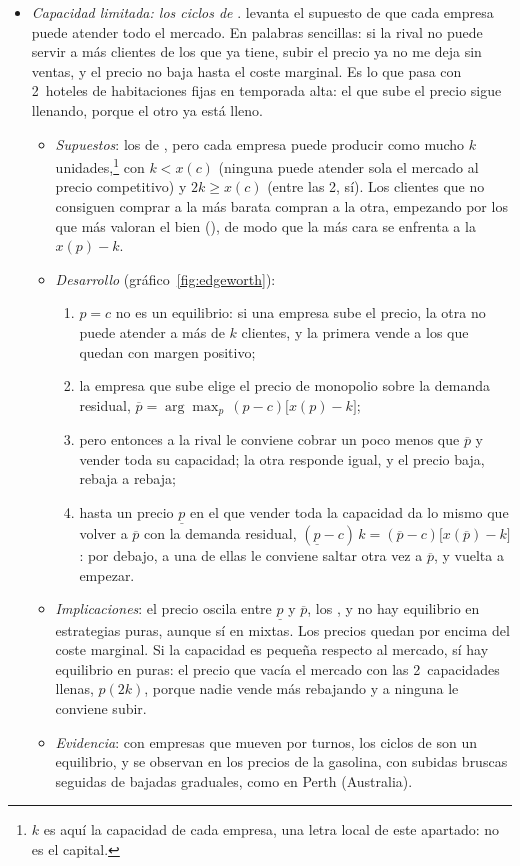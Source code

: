 \documentclass[11pt]{article}
\begin{document}
\begin{itemize}
\item \emph{Capacidad limitada: los ciclos de }. \textcite{Edgeworth1897Teoria} levanta el supuesto de que cada empresa puede atender todo el mercado. En palabras sencillas: si la rival no puede servir a más clientes de los que ya tiene, subir el precio ya no me deja sin ventas, y el precio no baja hasta el coste marginal. Es lo que pasa con 2~hoteles de habitaciones fijas en temporada alta: el que sube el precio sigue llenando, porque el otro ya está lleno.
  \begin{itemize}
  \item \emph{Supuestos}: los de , pero cada empresa puede producir como mucho $k$ unidades,\footnote{$k$ es aquí la capacidad de cada empresa, una letra local de este apartado: no es el capital.} con $k<x(c)$ (ninguna puede atender sola el mercado al precio competitivo) y $2k\geq x(c)$ (entre las 2, sí). Los clientes que no consiguen comprar a la más barata compran a la otra, empezando por los que más valoran el bien (), de modo que la más cara se enfrenta a la  $x(p)-k$.
  \item \emph{Desarrollo} (gráfico~\ref{fig:edgeworth}):
    \begin{enumerate}
    \item $p=c$ no es un equilibrio: si una empresa sube el precio, la otra no puede atender a más de $k$ clientes, y la primera vende a los que quedan con margen positivo;
    \item la empresa que sube elige el precio de monopolio sobre la demanda residual, $\overline{p}=\arg\max_p\,(p-c)\big[x(p)-k\big]$;
    \item pero entonces a la rival le conviene cobrar un poco menos que $\overline{p}$ y vender toda su capacidad; la otra responde igual, y el precio baja, rebaja a rebaja;
    \item hasta un precio $\underline{p}$ en el que vender toda la capacidad da lo mismo que volver a $\overline{p}$ con la demanda residual, $(\underline{p}-c)\,k=(\overline{p}-c)\big[x(\overline{p})-k\big]$: por debajo, a una de ellas le conviene saltar otra vez a $\overline{p}$, y vuelta a empezar.
    \end{enumerate}
  \item \emph{Implicaciones}: el precio oscila entre $\underline{p}$ y $\overline{p}$, los , y no hay equilibrio en estrategias puras, aunque sí en mixtas\nocite{LevitanShubik1972Price}. Los precios quedan por encima del coste marginal. Si la capacidad es pequeña respecto al mercado, sí hay equilibrio en puras: el precio que vacía el mercado con las 2~capacidades llenas, $p(2k)$, porque nadie vende más rebajando y a ninguna le conviene subir.
  \item \emph{Evidencia}: con empresas que mueven por turnos, los ciclos de  son un equilibrio\nocite{MaskinTirole1988DynamicII}, y se observan en los precios de la gasolina, con subidas bruscas seguidas de bajadas graduales, como en Perth (Australia)\nocite{ByrneDeRoos2019Learning}.
  \end{itemize}
\end{itemize}
\end{document}
